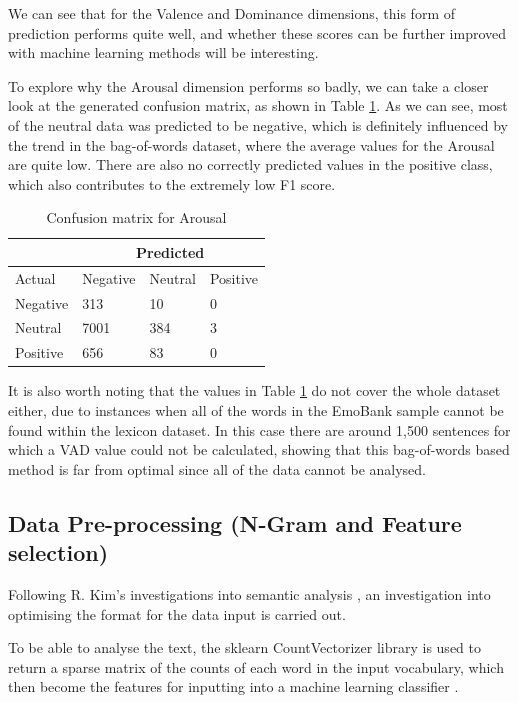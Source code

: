 We can see that for the Valence and Dominance dimensions, this form of prediction performs quite well, and whether these scores can be further improved with machine learning methods will be interesting.

To explore why the Arousal dimension performs so badly, we can take a closer look at the generated confusion matrix, as shown in Table \ref{lexicon:a:conmat}. As we can see, most of the neutral data was predicted to be negative, which is definitely influenced by the trend in the bag-of-words dataset, where the average values for the Arousal are quite low. There are also no correctly predicted values in the positive class, which also contributes to the extremely low F1 score.

\begin{table}
\centering
\label{lexicon:a:conmat}
\caption{Confusion matrix for Arousal}
\begin{tabular}{ |p{3cm}|p{3cm}|p{3cm}|p{3cm}| }
 \hline
  & \multicolumn{3}{|c|}{Predicted} \\
 \hline
   Actual & Negative & Neutral & Positive \\
    \hline
    Negative &  313   &  10  & 0 \\
    Neutral & 7001 & 384 &  3 \\
    Positive & 656 & 83 &  0 \\

 \hline
\end{tabular}

\end{table}


It is also worth noting that the values in Table \ref{lexicon:a:conmat} do not cover the whole dataset either, due to instances when all of the words in the EmoBank sample cannot be found within the lexicon dataset. In this case there are around 1,500 sentences for which a VAD value could not be calculated, showing that this bag-of-words based method is far from optimal since all of the data cannot be analysed.

\subsection{Data Pre-processing (N-Gram and Feature selection)}

Following R. Kim's investigations into semantic analysis \cite{towardsDS}, an investigation into optimising the format for the data input is carried out. 

To be able to analyse the text, the sklearn CountVectorizer library is used to return a sparse matrix of the counts of each word in the input vocabulary, which then become the features for inputting into a machine learning classifier \cite{sklearn}.

